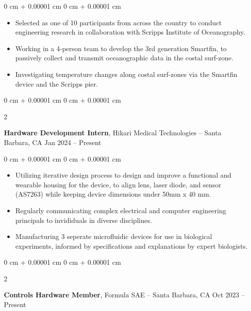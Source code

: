 \documentclass[10pt, letterpaper]{article}
\newenvironment{highlights}{
    \begin{itemize}[
        topsep=0.10 cm,
        parsep=0.10 cm,
        partopsep=0pt,
        itemsep=0pt,
        leftmargin=0 cm + 10pt
    ]
}{
    \end{itemize}
} %
\newenvironment{onecolentry}{
    \begin{adjustwidth}{
        0 cm + 0.00001 cm
    }{
        0 cm + 0.00001 cm
    }
}{
    \end{adjustwidth}
} %
\newenvironment{twocolentry}[2][]{
    \onecolentry
    \def\secondColumn{#2}
    \setcolumnwidth{\fill, 4.5 cm}
    \begin{paracol}{2}
}{
    \switchcolumn \raggedleft \secondColumn
    \end{paracol}
    \endonecolentry
} %
\begin{document}
    \vspace{0.10 cm}
    \begin{onecolentry}
        \begin{highlights}
            \item Selected as one of 10 participants from across the country to conduct engineering research in collaboration with Scripps Institute of Oceanography.
            \item Working in a 4-person team to develop the 3rd generation Smartfin, to passively collect and transmit oceanographic data in the costal surf-zone.
            \item Investigating temperature changes along costal surf-zones via the Smartfin device and the Scripps pier.
        \end{highlights}
    \end{onecolentry}


    \vspace{0.2 cm}
    
    \begin{twocolentry}{
            Jan 2024 – Present
        }
            \textbf{Hardware Development Intern}, Hikari Medical Technologies -- Santa Barbara, CA\end{twocolentry}

        \vspace{0.10 cm}
        \begin{onecolentry}
            \begin{highlights}
                \item Utilizing iterative design process to design and improve a functional and wearable housing for the device, to align lens, laser diode, and sensor (AS7263) while keeping device dimensions under 50mm x 40 mm.
                \item Regularly communicating complex electrical and computer engineering principals to invididuals in diverse disciplines.
                \item Manufacturing 3 seperate microfluidic devices for use in biological experiments, informed by specifications and explanations by expert biologists.
            \end{highlights}
        \end{onecolentry}

        \vspace{0.2 cm}

        \begin{twocolentry}{
            Oct 2023 – Present
        }
            \textbf{Controls Hardware Member}, Formula SAE -- Santa Barbara, CA\end{twocolentry}
\end{document}
